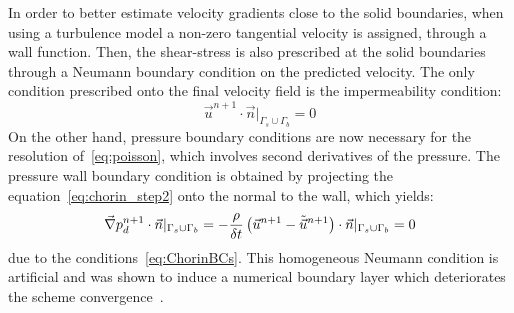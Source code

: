 In order to better estimate velocity gradients close to the solid boundaries, when using a turbulence model a non-zero tangential velocity is assigned,
through a wall function. Then, the shear-stress is also prescribed at the solid boundaries through a Neumann boundary condition on the predicted velocity.
The only condition prescribed onto the final velocity field is the impermeability condition:
\begin{equation}\label{eq:ChorinBCs}
      \vec{u}^{n+1}\cdot\vec{n}|_{\Gamma_s\cup\Gamma_b} = 0
\end{equation}
On the other hand, pressure boundary conditions are now necessary for the resolution of~\eqref{eq:poisson}, which involves second derivatives of the pressure.
The pressure wall boundary condition is obtained by projecting the equation~\eqref{eq:chorin_step2} onto the normal to the wall,
which yields:
\begin{equation}\label{eq:pressureHomogeneousNeumann}
  \vec \nabla p_d^{n+1} \cdot \vec{n}|_{\Gamma_s\cup\Gamma_b} = -\dfrac{\rho}{\delta t}\left(\vec{u}^{n+1}-\tilde{\vec{u}}^{n+1}\right) \cdot \vec{n}|_{\Gamma_s\cup\Gamma_b} = 0
\end{equation}
due to the conditions~\eqref{eq:ChorinBCs}.
This homogeneous Neumann condition is artificial and was shown to induce a numerical boundary layer which deteriorates the scheme convergence~\cite{Rannacher1992}.

